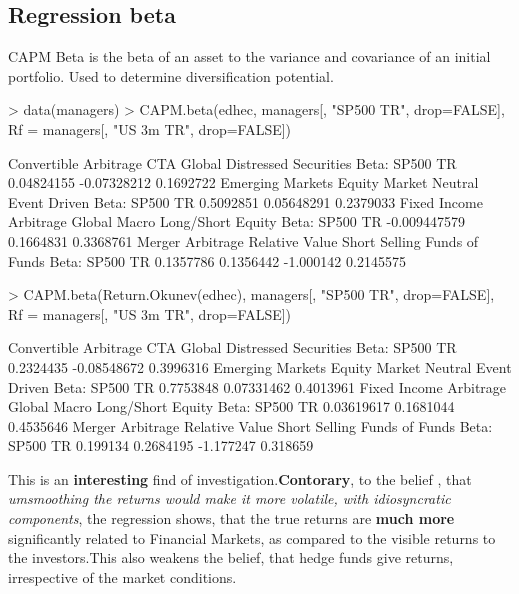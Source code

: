 \documentclass[12pt,letterpaper,english]{article}
\begin{document}
\subsection{Regression beta}

CAPM Beta is the beta of an asset to the variance and covariance of an initial portfolio.  Used to determine diversification potential.

\begin{Schunk}
\begin{Sinput}
> data(managers)
> CAPM.beta(edhec, managers[, "SP500 TR", drop=FALSE], Rf = managers[, "US 3m TR", drop=FALSE])
\end{Sinput}
\begin{Soutput}
               Convertible Arbitrage  CTA Global Distressed Securities
Beta: SP500 TR            0.04824155 -0.07328212             0.1692722
               Emerging Markets Equity Market Neutral Event Driven
Beta: SP500 TR        0.5092851            0.05648291    0.2379033
               Fixed Income Arbitrage Global Macro Long/Short Equity
Beta: SP500 TR           -0.009447579    0.1664831         0.3368761
               Merger Arbitrage Relative Value Short Selling Funds of Funds
Beta: SP500 TR        0.1357786      0.1356442     -1.000142      0.2145575
\end{Soutput}
\begin{Sinput}
> CAPM.beta(Return.Okunev(edhec), managers[, "SP500 TR", drop=FALSE], Rf = managers[, "US 3m TR", drop=FALSE])
\end{Sinput}
\begin{Soutput}
               Convertible Arbitrage  CTA Global Distressed Securities
Beta: SP500 TR             0.2324435 -0.08548672             0.3996316
               Emerging Markets Equity Market Neutral Event Driven
Beta: SP500 TR        0.7753848            0.07331462    0.4013961
               Fixed Income Arbitrage Global Macro Long/Short Equity
Beta: SP500 TR             0.03619617    0.1681044         0.4535646
               Merger Arbitrage Relative Value Short Selling Funds of Funds
Beta: SP500 TR         0.199134      0.2684195     -1.177247       0.318659
\end{Soutput}
\end{Schunk}

This is an \textbf{interesting} find of investigation.\textbf{Contorary}, to the belief , that \emph{umsmoothing the returns would make it more volatile, with idiosyncratic components}, the regression shows, that the true returns are \textbf{much more} significantly related to Financial Markets, as compared to the visible returns to the investors.This also weakens the belief, that hedge funds give returns, irrespective of the market conditions. 
\end{document}
